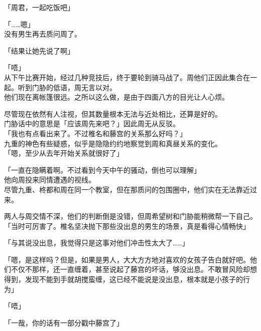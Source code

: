 「周君，一起吃饭吧」

「……嗯」\\

没有男生再去质问周了。\\

\vspace{2\baselineskip}

「结果让她先说了啊」

「唔」\\

从下午比赛开始，经过几种竞技后，终于要轮到骑马战了。周他们正因此集合在一起。听到门胁的低语，周无言以对。\\

他们现在离帐篷很远。之所以这么做，是由于四面八方的目光让人心烦。

尽管现在依然有人注视，但其数量根本无法与近处相比，还算是好的。\\

门胁话中的意思是「应该周先来吧？」因此周无从反驳。\\

「我也有点看出来了。不过椎名和藤宫的关系那么好吗？」\\

九重的神色有些疑惑，似乎是隐隐约约地察觉到周和真昼关系的变化。\\

「嗯，至少从去年开始关系就很好了」

「一直在隐瞒着啊。不过看到今天中午的骚动，倒也可以理解」\\

他向周投来同情遭遇的视线。\\

尽管九重、柊都和周在同一个教室，但在那质问的包围圈中，他们实在无法靠近过来。

两人与周交情不深，他们的判断倒是没错，但周希望树和门胁能稍微帮一下自己。\\

「当时可厉害了。椎名坚决抛下那些没出息的男生的场景，真是看得心情畅快」

「与其说没出息，我觉得只是这事对他们冲击性太大了……」

「嗯，是这样吗？但是，如果是男人，大大方方地对喜欢的女孩子告白就好吧。他们不仅不那样，还一直缠着，甚至说起了藤宫的坏话，够没出息。不敢冒风险却想得到，发现不能到手就胡搅蛮缠，这已经不能说是没出息，根本就是小孩子的行为」

「唔」

「一哉，你的话有一部分戳中藤宫了」\\

